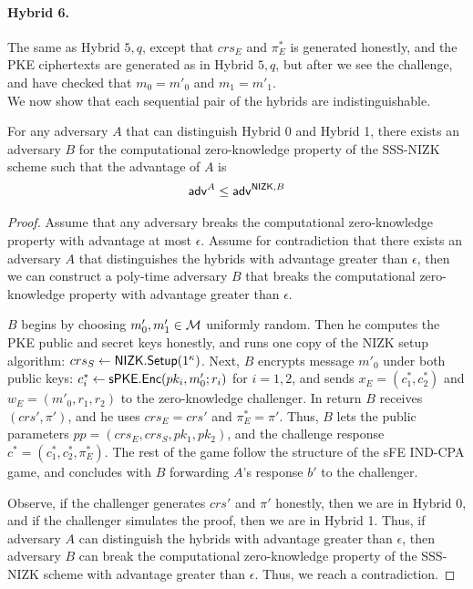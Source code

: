 \documentclass{llncs}
\begin{document}
\paragraph{Hybrid 6.} The same as Hybrid $5,q$, except that $crs_E$ and $\pi_E^*$ is generated honestly, and the PKE ciphertexts are generated as in  Hybrid $5,q$, but after we see the challenge, and have checked that $m_0 = m'_0$ and $m_1 = m'_1$. \\

We  now show that each sequential pair of the hybrids are indistinguishable.


\begin{claim} \label{claim:sFE_IND-CPA_ZK_1}
For any adversary $A$ that can distinguish Hybrid 0 and Hybrid 1, there exists an adversary $B$ for the computational zero-knowledge property of the SSS-NIZK scheme such that the advantage of $A$ is
	\begin{align*}
	\mathsf{adv}^{A} \leq \mathsf{adv}^{\mathsf{NIZK},B}
	\end{align*}
\end{claim}



\begin{proof}
Assume that any adversary breaks the computational zero-knowledge property with advantage at most $\epsilon$.
Assume for contradiction that there exists an adversary $A$ that distinguishes the hybrids with advantage greater than $\epsilon$, then we can construct a poly-time adversary $B$ that breaks the computational zero-knowledge property with advantage greater than $\epsilon$. 

$B$ begins by choosing $m'_0,m'_1 \in \mathcal{M}$ uniformly random. Then he computes the PKE public and secret keys honestly, and runs one copy of the NIZK setup algorithm: $crs_S \leftarrow \mathsf{NIZK}.\mathsf{Setup}(1^\kappa)$. Next, $B$ encrypts message $m'_0$ under both public keys: $c_i^* \leftarrow \mathsf{sPKE}.\mathsf{Enc}(pk_i,m'_0;r_i)$ for $i=1,2$, and sends $x_E = (c_1^*,c_2^*)$ and $w_E = (m'_0,r_1,r_2)$ to the zero-knowledge challenger. In return $B$ receives $(crs',\pi')$, and he uses $crs_E = crs'$ and $\pi_E^* = \pi'$. Thus, $B$ lets the public parameters $pp = (crs_E,crs_S,pk_1,pk_2)$, and the challenge response $c^* = (c_1^*,c_2^*,\pi_E^*)$. 
The rest of the game follow the structure of the sFE IND-CPA game, and concludes with $B$ forwarding $A$'s response $b'$ to the challenger. 

Observe, if the challenger generates $crs'$ and $\pi'$ honestly, then we are in Hybrid 0, and if the challenger simulates the proof, then we are in Hybrid 1. Thus, if adversary $A$ can distinguish the hybrids with advantage greater than $\epsilon$, then adversary $B$ can break the computational zero-knowledge property of the SSS-NIZK scheme with advantage greater than $\epsilon$. Thus, we reach a contradiction.
\end{proof}
\end{document}
